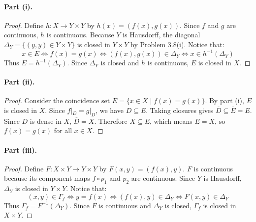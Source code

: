 
\paragraph{Part (i).}
\begin{proof}
Define $h\colon X\to Y\times Y$ by $h(x)=(f(x),g(x))$. Since $f$ and $g$ are continuous, $h$ is
continuous. Because $Y$ is Hausdorff, the diagonal $\Delta_Y=\{(y,y)\in Y\times Y\}$ is closed
in $Y\times Y$ by Problem 3.8(i). Notice that:
\[ x\in E\iff f(x)=g(x)\iff(f(x),g(x))\in\Delta_Y\iff x\in h^{-1}(\Delta_Y) \]
Thus $E=h^{-1}(\Delta_Y)$. Since $\Delta_Y$ is closed and $h$ is continuous, $E$ is closed in
$X$.
\end{proof}

\paragraph{Part (ii).}
\begin{proof}
Consider the coincidence set $E=\{x\in X\mid f(x)=g(x)\}$. By part (i), $E$ is closed in $X$.
Since $f|_D=g|_D$, we have $D\subseteq E$. Taking closures gives
$\overline{D}\subseteq\overline{E}=E$. Since $D$ is dense in $X$, $\overline{D}=X$. Therefore
$X\subseteq E$, which means $E=X$, so $f(x)=g(x)$ for all $x\in X$.
\end{proof}

\paragraph{Part (iii).}
\begin{proof}
Define $F\colon X\times Y\to Y\times Y$ by $F(x,y)=(f(x),y)$. $F$ is continuous because its
component maps $f\circ p_1$ and $p_2$ are continuous. Since $Y$ is Hausdorff, $\Delta_Y$ is
closed in $Y\times Y$. Notice that:
\[ (x,y)\in\Gamma_f\iff y=f(x)\iff(f(x),y)\in\Delta_Y\iff F(x,y)\in\Delta_Y \]
Thus $\Gamma_f=F^{-1}(\Delta_Y)$. Since $F$ is continuous and $\Delta_Y$ is closed, $\Gamma_f$
is closed in $X\times Y$.
\end{proof}

